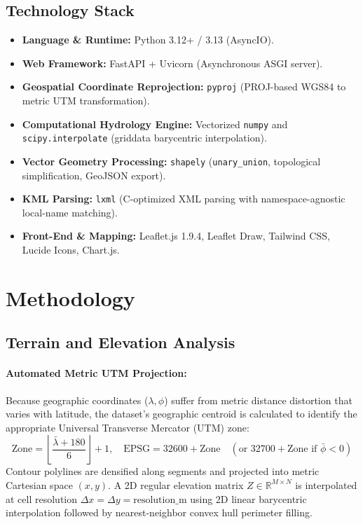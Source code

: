 \documentclass[manuscript,screen,review]{acmart}
\begin{document}
\subsection{Technology Stack}
\begin{itemize}[noitemsep]
    \item \textbf{Language \& Runtime:} Python 3.12+ / 3.13 (AsyncIO).
    \item \textbf{Web Framework:} FastAPI + Uvicorn (Asynchronous ASGI server).
    \item \textbf{Geospatial Coordinate Reprojection:} \texttt{pyproj} (PROJ-based WGS84 to metric UTM transformation).
    \item \textbf{Computational Hydrology Engine:} Vectorized \texttt{numpy} and \texttt{scipy.interpolate} (griddata barycentric interpolation).
    \item \textbf{Vector Geometry Processing:} \texttt{shapely} (\texttt{unary\_union}, topological simplification, GeoJSON export).
    \item \textbf{KML Parsing:} \texttt{lxml} (C-optimized XML parsing with namespace-agnostic local-name matching).
    \item \textbf{Front-End \& Mapping:} Leaflet.js 1.9.4, Leaflet Draw, Tailwind CSS, Lucide Icons, Chart.js.
\end{itemize}

\section{Methodology}
\label{sec:methodology}

\subsection{Terrain and Elevation Analysis}
\paragraph{Automated Metric UTM Projection:} Because geographic coordinates ($\lambda, \phi$) suffer from metric distance distortion that varies with latitude, the dataset's geographic centroid is calculated to identify the appropriate Universal Transverse Mercator (UTM) zone:
\begin{equation}
\text{Zone} = \left\lfloor \frac{\bar{\lambda} + 180}{6} \right\rfloor + 1, \quad \text{EPSG} = 32600 + \text{Zone} \quad (\text{or } 32700 + \text{Zone if } \bar{\phi} < 0)
\end{equation}
Contour polylines are densified along segments and projected into metric Cartesian space $(x, y)$. A 2D regular elevation matrix $Z \in \mathbb{R}^{M \times N}$ is interpolated at cell resolution $\Delta x = \Delta y = \text{resolution\_m}$ using 2D linear barycentric interpolation followed by nearest-neighbor convex hull perimeter filling.
\end{document}
